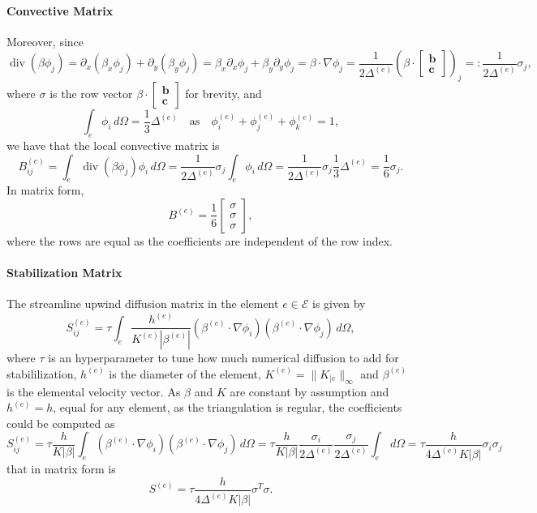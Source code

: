 \documentclass[hidelinks]{article}
\DeclareMathOperator{\divg}{div}
\begin{document}
\paragraph{Convective Matrix}
Moreover, since \[
\divg (\beta \phi_j) = \partial_x (\beta_x \phi_j) + \partial_y (\beta_y \phi_j) = \beta_x \partial_x \phi_j +  \beta_y \partial_y \phi_j = \beta \cdot \nabla \phi_j = \frac{1}{2\Delta^{(e)}}\left(\beta \cdot \begin{bmatrix}
    \mathbf{b} \\
    \mathbf{c}
\end{bmatrix} \right)_j =: \frac{1}{2\Delta^{(e)}} \sigma_j,
\] 
where $\sigma$ is the row vector $\beta \cdot \begin{bmatrix}
    \mathbf{b} \\
    \mathbf{c}
\end{bmatrix}$ for brevity, and
\[
\int_e \phi_i \, d\Omega = \frac{1}{3} \Delta^{(e)} \quad \text{as} \quad \phi^{(e)}_i + \phi^{(e)}_j + \phi^{(e)}_k = 1,
\]
we have that the local convective matrix is
\[
B_{ij}^{(e)} = \int_e \divg (\beta \phi_j) \phi_i \, d\Omega = \frac{1}{2\Delta^{(e)}}\sigma_j \int_e \phi_i \, d\Omega = \frac{1}{2\Delta^{(e)}}\sigma_j \frac{1}{3} \Delta^{(e)} = \frac{1}{6} \sigma_j.
\]
In matrix form,
\[
B^{(e)} = \frac{1}{6} \begin{bmatrix} \sigma \\ \sigma \\ \sigma
\end{bmatrix},
\]
where the rows are equal as the coefficients are independent of the row index.

\paragraph{Stabilization Matrix} The streamline upwind diffusion matrix in the element $e\in\mathcal{E}$ is given by
\[
S_{ij}^{(e)} = \tau \int_e \frac{h^{(e)}}{K^{(e)}|\beta^{(e)}|}(\beta^{(e)}\cdot \nabla \phi_i)(\beta^{(e)}\cdot \nabla \phi_j)\, d\Omega,
\]
where $\tau$ is an hyperparameter to tune how much numerical diffusion to add for stabililization, $h^{(e)}$ is the diameter of the element, $K^{(e)} = \|K_{|e}\|_\infty$ and $\beta^{(e)}$ is the elemental velocity vector.
As $\beta$ and $K$ are constant by assumption and $h^{(e)}=h$, equal for any element, as the triangulation is regular, the coefficients could be computed as 
\[
S_{ij}^{(e)} = \tau \frac{h}{K|\beta|}\int_e (\beta^{(e)}\cdot \nabla \phi_i)(\beta^{(e)}\cdot \nabla \phi_j)\, d\Omega = \tau \frac{h}{K|\beta|} \frac{\sigma_i}{2\Delta^{(e)}} \frac{\sigma_j}{2\Delta^{(e)}} \int_e \,d\Omega = 
\tau \frac{h}{4\Delta^{(e)}K|\beta|}\sigma_i\sigma_j
\] that in matrix form is 
\[
S^{(e)} = \tau \frac{h}{4\Delta^{(e)}K|\beta|} \sigma^T \sigma.
\]
\end{document}
